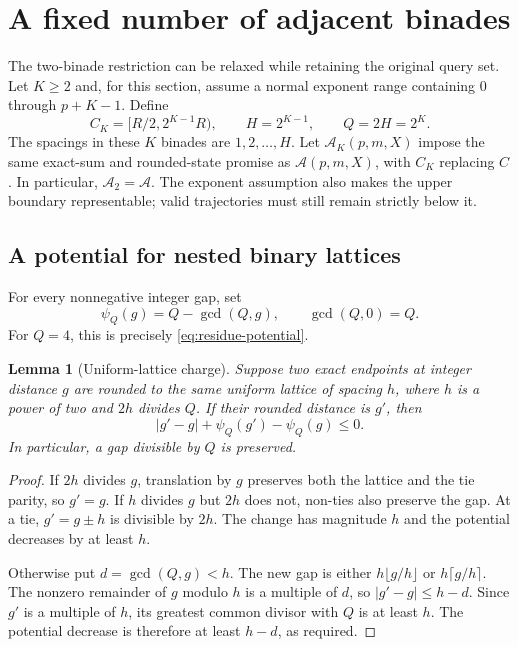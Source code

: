 \documentclass[11pt,reqno]{amsart}
\newtheorem{lemma}[theorem]{Lemma}
\theoremstyle{definition}
\theoremstyle{remark}
\numberwithin{equation}{section}
\begin{document}
\section{A fixed number of adjacent binades}
\label{sec:multibinade}

The two-binade restriction can be relaxed while retaining the original query
set. Let $K\geq2$ and, for this section, assume a normal exponent range
containing $0$ through $p+K-1$. Define
\begin{equation}
\label{eq:multibinade-parameters}
 C_K=[R/2,2^{K-1}R),\qquad H=2^{K-1},\qquad Q=2H=2^K.
\end{equation}
The spacings in these $K$ binades are $1,2,\ldots,H$. Let
$\mathcal A_K(p,m,X)$ impose the same exact-sum and rounded-state promise
as $\mathcal A(p,m,X)$, with $C_K$ replacing $C$. In particular,
$\mathcal A_2=\mathcal A$. The exponent assumption also makes the upper
boundary representable; valid trajectories must still remain strictly below it.

\subsection{A potential for nested binary lattices}

For every nonnegative integer gap, set
\begin{equation}
\label{eq:gcd-potential}
 \psi_Q(g)=Q-\gcd(Q,g),\qquad \gcd(Q,0)=Q.
\end{equation}
For $Q=4$, this is precisely \eqref{eq:residue-potential}.

\begin{lemma}[Uniform-lattice charge]
\label{lem:uniform-Q}
Suppose two exact endpoints at integer distance $g$ are rounded to the same
uniform lattice of spacing $h$, where $h$ is a power of two and $2h$ divides
$Q$. If their rounded distance is $g'$, then
\[
 |g'-g|+\psi_Q(g')-\psi_Q(g)\leq0.
\]
In particular, a gap divisible by $Q$ is preserved.
\end{lemma}

\begin{proof}
If $2h$ divides $g$, translation by $g$ preserves both the lattice and the
tie parity, so $g'=g$. If $h$ divides $g$ but $2h$ does not, non-ties also
preserve the gap. At a tie, $g'=g\pm h$ is divisible by $2h$. The change
has magnitude $h$ and the potential decreases by at least $h$.

Otherwise put $d=\gcd(Q,g)<h$. The new gap is either
$h\lfloor g/h\rfloor$ or $h\lceil g/h\rceil$. The nonzero remainder of $g$
modulo $h$ is a multiple of $d$, so $|g'-g|\leq h-d$. Since $g'$ is a
multiple of $h$, its greatest common divisor with $Q$ is at least $h$.
The potential decrease is therefore at least $h-d$, as required.
\end{proof}
\end{document}
